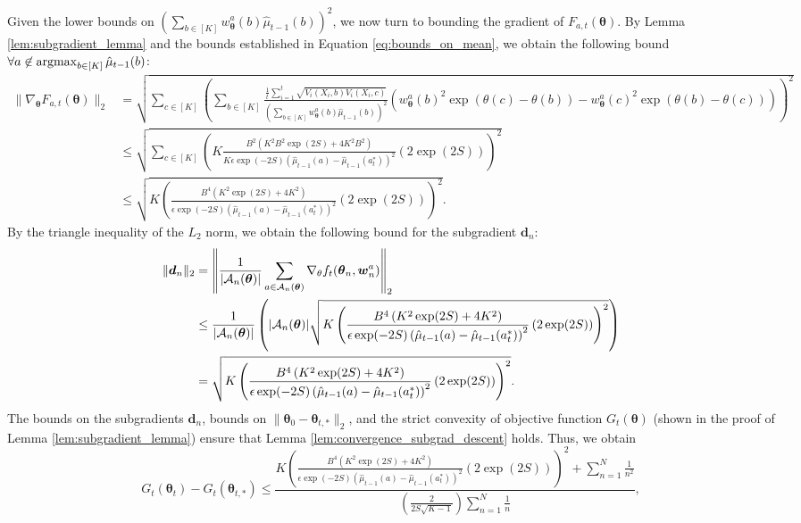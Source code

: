\documentclass{article}
\begin{document}
\begin{appendices}
\begin{equation}
\end{equation}
Given the lower bounds on $\left(\sum_{b \in [K]} w_{\bm\theta}^a(b)\hat\mu_{t-1}(b) \right)^2$, we now turn to bounding the gradient of $F_{a,t}(\bm{\theta})$. By Lemma \ref{lem:subgradient_lemma} and the bounds established in Equation \eqref{eq:bounds_on_mean}, we obtain the following bound $\forall a \not\in \argmax_{b \in [K]} \hat\mu_{t-1}(b)$: 
\begin{align}
    \|\nabla_{\bm\theta} F_{a,t}(\bm{\theta})\|_2 &= \sqrt{\sum_{c \in [K]}\left( \sum_{b \in [K]}\frac{\frac{1}{t}\sum_{i=1}^t\sqrt{V_i(X_i,b)V_i(X_i,c)} }{\left(\sum_{b \in [K]} w_{\bm{\theta}}^a(b) \hat\mu_{t-1}(b)\right)^2} \left(  w_{\bm\theta}^a(b)^2\exp(\theta(c) - \theta(b)) - w_{\bm\theta}^a(c)^2 \exp(\theta(b)-\theta(c))\right)\right)^2  }\\
    &\leq \sqrt{\sum_{c \in [K]} \left(K\frac{B^2\left(K^2B^2\exp(2S)+ 4K^2B^2\right)}{K\epsilon\exp(-2S)\left(\hat\mu_{t-1}(a) - \hat\mu_{t-1}(a_t^*)\right)^2}\left(2\exp(2S) \right) \right)^2} \\
    & \leq \sqrt{K\left(\frac{B^4\left(K^2\exp(2S)+ 4K^2\right)}{\epsilon\exp(-2S)\left(\hat\mu_{t-1}(a) - \hat\mu_{t-1}(a_t^*)\right)^2}\left(2\exp(2S) \right) \right)^2}. \label{eq:}
\end{align}
By the triangle inequality of the $L_2$ norm, we obtain the following bound for the subgradient $\bm{d}_n$:
\begin{align}
    \|\boldsymbol{d}_n\|_2 &= \left\|\frac{1}{|\mathcal{A}_n(\boldsymbol\theta)|}\sum_{a \in \mathcal{A}_n(\boldsymbol\theta)} \nabla_\theta f_{t}(\boldsymbol\theta_n, \boldsymbol{w}_n^a)\right\|_2 \\ 
    &\leq \frac{1}{|\mathcal{A}_n(\boldsymbol\theta)|} \left( |\mathcal{A}_n(\boldsymbol\theta)| \sqrt{K\left(\frac{B^4\left(K^2\exp(2S)+ 4K^2\right)}{\epsilon\exp(-2S)\left(\hat\mu_{t-1}(a) - \hat\mu_{t-1}(a_t^*)\right)^2}\left(2\exp(2S) \right) \right)^2} \right) \\
    & = \sqrt{K\left(\frac{B^4\left(K^2\exp(2S)+ 4K^2\right)}{\epsilon\exp(-2S)\left(\hat\mu_{t-1}(a) - \hat\mu_{t-1}(a_t^*)\right)^2}\left(2\exp(2S) \right) \right)^2}.
\end{align}
The bounds on the subgradients $\bm{d}_n$, bounds on $\|\bm{\theta}_0 - \bm\theta_{t, *} \|_2$, and the strict convexity of objective function $G_t(\bm{\theta})$ (shown in the proof of Lemma \ref{lem:subgradient_lemma}) ensure that Lemma \ref{lem:convergence_subgrad_descent} holds. Thus, we obtain
\begin{equation}
    G_t(\bm\theta_t) - G_t(\bm\theta_{t, *}) \leq \frac{{K\left(\frac{B^4\left(K^2\exp(2S)+ 4K^2\right)}{\epsilon\exp(-2S)\left(\hat\mu_{t-1}(a) - \hat\mu_{t-1}(a_t^*)\right)^2}\left(2\exp(2S) \right) \right)^2}+\sum_{n=1}^{N} \frac{1}{n^2}}{\left(\frac{2}{2S\sqrt{K-1}}\right)\sum_{n=1}^{N}\frac{1}{n}},

\end{equation}
\end{appendices}
\end{document}

